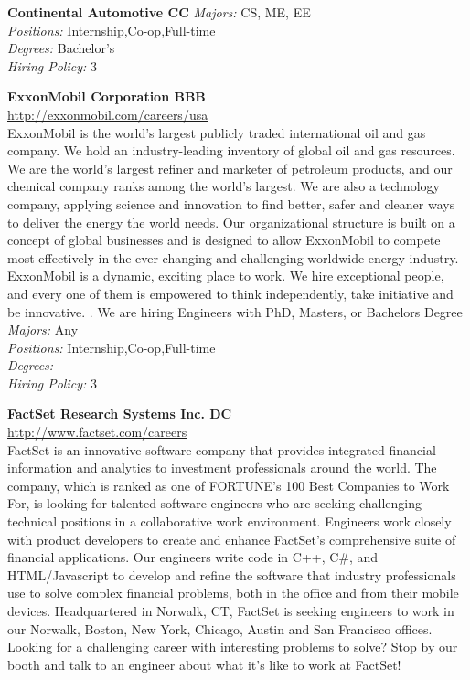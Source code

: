 \documentclass[twoside]{article}
\begin{document}
\begin{center}
\begin{multicols}{2}
\begin{minipage}{.95\columnwidth}{\Large\bf Continental Automotive \hfill CC}
    \emph{Majors:} CS, ME, EE\\
    \emph{Positions:} Internship,Co-op,Full-time\\
    \emph{Degrees:} Bachelor's\\
    \emph{Hiring Policy:} 3\\
\end{minipage}
 \begin{minipage}{.95\columnwidth}{\Large\bf ExxonMobil Corporation \hfill BBB}\\
    \url{http://exxonmobil.com/careers/usa}\\
    ExxonMobil is the world’s largest publicly traded international oil and gas company. We hold an industry-leading inventory of global oil and gas resources. We are the world’s largest refiner and marketer of petroleum products, and our chemical company ranks among the world’s largest. We are also a technology company, applying science and innovation to find better, safer and cleaner ways to deliver the energy the world needs. Our organizational structure is built on a concept of global businesses and is designed to allow ExxonMobil to compete most effectively in the ever-changing and challenging worldwide energy industry. ExxonMobil is a dynamic, exciting place to work. We hire exceptional people, and every one of them is empowered to think independently, take initiative and be innovative. . We are hiring Engineers with PhD, Masters, or Bachelors Degree\\
    \emph{Majors:} Any\\
    \emph{Positions:} Internship,Co-op,Full-time\\
    \emph{Degrees:} \\
    \emph{Hiring Policy:} 3\\
\end{minipage}
 \begin{minipage}{.95\columnwidth}{\Large\bf FactSet Research Systems Inc. \hfill DC}\\
    \url{http://www.factset.com/careers}\\
    FactSet is an innovative software company that provides integrated financial information and analytics to investment professionals around the world. The company, which is ranked as one of FORTUNE’s 100 Best Companies to Work For, is looking for talented software engineers who are seeking challenging technical positions in a collaborative work environment. Engineers work closely with product developers to create and enhance FactSet's comprehensive suite of financial applications. Our engineers write code in C++, C\#, and HTML/Javascript to develop and refine the software that industry professionals use to solve complex financial problems, both in the office and from their mobile devices. Headquartered in Norwalk, CT, FactSet is seeking engineers to work in our Norwalk, Boston, New York, Chicago, Austin and San Francisco offices. Looking for a challenging career with interesting problems to solve? Stop by our booth and talk to an engineer about what it’s like to work at FactSet!\\

\end{minipage}
\end{multicols}
\end{center}
\end{document}
